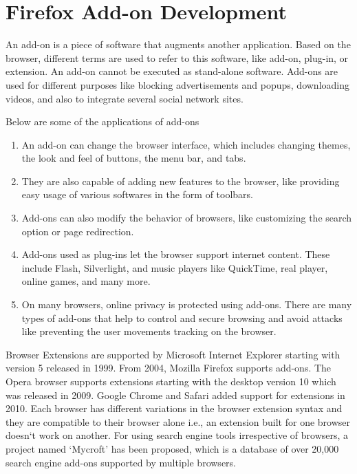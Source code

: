 \chapter{Firefox Add-on Development}

An add-on is a piece of software that augments another application. Based on the browser, different terms are used to refer to this software, like add-on, plug-in, or extension. An add-on cannot be executed as stand-alone software. Add-ons are used for different purposes like blocking advertisements and popups, downloading videos, and also to integrate several social network sites. 

Below are some of the applications of add-ons
\begin{enumerate}
\item An add-on can change the browser interface, which includes changing themes, the look and feel of buttons, the menu bar, and tabs.
\item They are also capable of adding new features to the browser, like providing easy usage of various softwares in the form of toolbars. 
\item Add-ons can also modify the behavior of browsers, like customizing the search option or page redirection. 
\item Add-ons used as plug-ins let the browser support internet content. These include Flash, Silverlight, and music players like QuickTime, real player, online games, and many more. 
\item On many browsers, online privacy is protected using add-ons. There are many types of add-ons that help to control and secure browsing and avoid attacks like preventing the user movements tracking on the browser.
\end{enumerate}

Browser Extensions are supported by Microsoft Internet Explorer starting with version 5 released in 1999. From 2004, Mozilla Firefox supports add-ons. The Opera browser supports extensions starting with the desktop version 10 which was released in 2009. Google Chrome and Safari added support for extensions in 2010. Each browser has different variations in the browser extension syntax and they are compatible to their browser alone i.e., an extension built for one browser doesn`t work on another. For using search engine tools irrespective of browsers, a project named `Mycroft' \cite{bib13} has been proposed, which is a database of over 20,000 search engine add-ons supported by multiple browsers.

